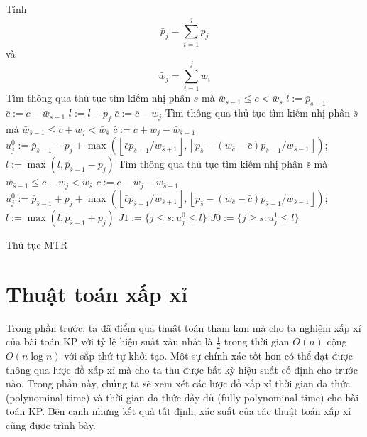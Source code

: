 \begin{algorithm}[!ht]
    \DontPrintSemicolon
    \vspace{1em}
    \vspace{1em}
    {
        Tính 
        \begin{equation*}
            \bar{p}_j = \sum_{i = 1}^jp_j
        \end{equation*}
        và 
        \begin{equation*}
            \bar{w}_j = \sum_{i = 1}^jw_i
        \end{equation*}
    }
    Tìm thông qua thủ tục tìm kiếm nhị phân $s$ mà $\bar{w}_{s-1} \leq c < \bar{w}_s$\;
    $l:=\bar{p}_{s-1}$\;
    $\bar{c}:=c-\bar{w}_{s-1}$\;
    {
        {
            $l:=l+p_j$\;
            $\bar{c}:=\bar{c}-w_j$\;
        }
    }
    {
        Tìm thông qua thủ tục tìm kiếm nhị phân $\bar{s}$ mà $\bar{w}_{\bar{s}-1} \leq c + w_j < \bar{w}_{\bar{s}}$\;
        $\bar{c}:= c + w_j - \bar{w}_{\bar{s} - 1}$\;
        $u^0_j := \bar{p}_{\bar{s}-1} - p_j + \max(\left \lfloor \bar{c}p_{\bar{s} + 1} / w_{\bar{s} + 1} \right \rfloor, \left \lfloor p_{\bar{s}} - (w_{\bar{c}} - \bar{c})p_{\bar{s} - 1}/w_{\bar{s} - 1}\right \rfloor)$;\ 
        $l := \max(l, \bar{p}_{\bar{s} - 1} - p_j)$\;
    }
    {
        Tìm thông qua thủ tục tìm kiếm nhị phân $\bar{s}$ mà $\bar{w}_{\bar{s}-1} \leq c - w_j < \bar{w}_{\bar{s}}$\;
        $\bar{c}:= c - w_j - \bar{w}_{\bar{s} - 1}$\;
        $u^0_j := \bar{p}_{\bar{s}-1} + p_j + \max(\left \lfloor \bar{c}p_{\bar{s} + 1} / w_{\bar{s} + 1} \right \rfloor, \left \lfloor p_{\bar{s}} - (w_{\bar{c}} - \bar{c})p_{\bar{s} - 1}/w_{\bar{s} - 1}\right \rfloor)$;\ 
        $l := \max(l, \bar{p}_{\bar{s} - 1} + p_j)$\;
    }
    $J1 := \{j \leq s: u^0_j \leq l\}$\; 
    $J0 := \{j \geq s: u^1_j \leq l\}$\;
    \caption{Thủ tục MTR}
    \label{algo:mtr}
\end{algorithm}

\begin{example}
    
\end{example}

\section{Thuật toán xấp xỉ}

Trong phần trước, ta đã điểm qua thuật toán tham lam mà cho ta nghiệm xấp xỉ của bài toán KP với tỷ lệ hiệu suất xấu nhất là $\frac{1}{2}$ trong thời gian $O(n)$ cộng $O(n\log n)$ với sắp thứ tự khởi tạo. Một sự chính xác tốt hơn có thể đạt được thông qua lược đồ xấp xỉ mà cho ta thu được bất kỳ hiệu suất cố định cho trước nào. Trong phần này, chúng ta sẽ xem xét các lược đồ xấp xỉ thời gian đa thức (polynominal-time) và thời gian đa thức đầy đủ (fully polynominal-time) cho bài toán KP. Bên cạnh những kết quả tất định, xác suất của các thuật toán xấp xỉ cũng được trình bày.


